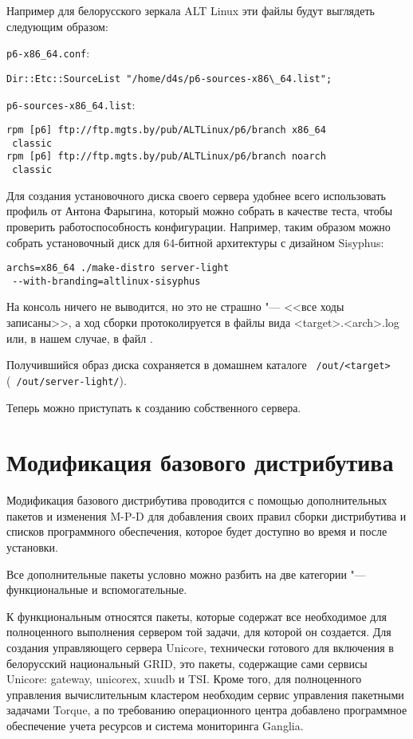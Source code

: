 \documentclass[10pt, a5paper]{article}
\begin{document}
Например для белорусского зеркала ALT Linux эти файлы будут выглядеть следующим образом:

{\tt p6-x86\_64.conf}:
\begin{verbatim}
Dir::Etc::SourceList "/home/d4s/p6-sources-x86\_64.list";
\end{verbatim}

{\tt p6-sources-x86\_64.list}:
\begin{verbatim}
rpm [p6] ftp://ftp.mgts.by/pub/ALTLinux/p6/branch x86_64
 classic
rpm [p6] ftp://ftp.mgts.by/pub/ALTLinux/p6/branch noarch
 classic
\end{verbatim}

Для создания установочного диска своего сервера удобнее всего использовать 
профиль от Антона Фарыгина, который можно собрать в качестве теста, 
чтобы проверить работоспособность конфигурации. 
Например, таким образом можно собрать установочный диск для 64-битной 
архитектуры с дизайном Sisyphus:
\begin{verbatim}
archs=x86_64 ./make-distro server-light
 --with-branding=altlinux-sisyphus
\end{verbatim}

На консоль ничего не выводится, но это не страшно "--- <<все ходы записаны>>, 
а ход сборки протоколируется в файлы вида \linebreak <target>.<arch>.log или, в нашем 
случае, в файл .

Получившийся образ диска сохраняется в домашнем каталоге {\tt ~/out/<target>} ({\tt ~/out/server-light/}).

Теперь можно приступать к созданию собственного сервера.

\section*{Модификация базового дистрибутива}
Модификация базового дистрибутива проводится с помощью дополнительных пакетов 
и изменения M-P-D для добавления своих правил сборки дистрибутива и 
списков программного обеспечения, которое будет доступно во время и после установки.

Все дополнительные пакеты условно можно разбить на две категории "--- функциональные и вспомогательные.

К функциональным относятся пакеты, которые содержат все необходимое для 
полноценного выполнения сервером той задачи, для которой он создается.
Для создания управляющего сервера Unicore, технически готового для включения 
в белорусский национальный GRID, это пакеты, содержащие сами сервисы Unicore: 
gateway, unicorex, xuudb и TSI. 
Кроме того, для полноценного управления вычислительным кластером необходим сервис 
управления пакетными задачами Torque, а по требованию операционного центра 
добавлено программное обеспечение учета ресурсов и система мониторинга Ganglia.
\end{document}
